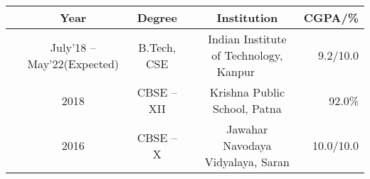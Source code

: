 
\newcommand{\education}[4]{
  & #1 & #2 & &#3 & #4
}
{
\fontsize{10pt}{1em}\selectfont
\begin{tabular}{ | L{0.05cm} c | c | L{0.2cm} c | r |}
  \hline
  \rule{0pt}{1.1\normalbaselineskip}
  \education{\textbf{Year}}{\textbf{Degree}}{\textbf{Institution}}{\textbf{CGPA/\%}}\\
  \hline
  \rule{0pt}{1.1\normalbaselineskip}
  \education{July'18 -- May'22(Expected)}{B.Tech, CSE}{Indian Institute of Technology, Kanpur~~~~}{9.2/10.0}\\
  \rule{0pt}{1.1\normalbaselineskip}
  \education{2018}{CBSE -- XII}{Krishna Public School, Patna}{92.0\%}\\
  \rule{0pt}{1.1\normalbaselineskip}
  \education{2016}{CBSE -- X}{Jawahar Navodaya Vidyalaya, Saran}{10.0/10.0}\\
  \hline
\end{tabular}

}